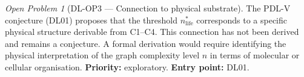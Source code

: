 \documentclass[11pt,a4paper]{article}
\theoremstyle{plain}
\theoremstyle{definition}
\theoremstyle{remark}
\newtheorem{openproblem}[theorem]{Open Problem}
\begin{document}
\begin{openproblem}[DL-OP3 --- Connection to physical substrate]
\label{op:DL_substrate}
The PDL-V conjecture (DL01) proposes that the threshold $n^*_{\mathrm{life}}$ corresponds to a specific physical structure derivable from C1--C4. This connection has not been derived and remains a conjecture. A formal derivation would require identifying the physical interpretation of the graph complexity level $n$ in terms of molecular or cellular organisation. \textbf{Priority:} exploratory. \textbf{Entry point:} DL01.
\end{openproblem}

\clearpage



\end{document}
